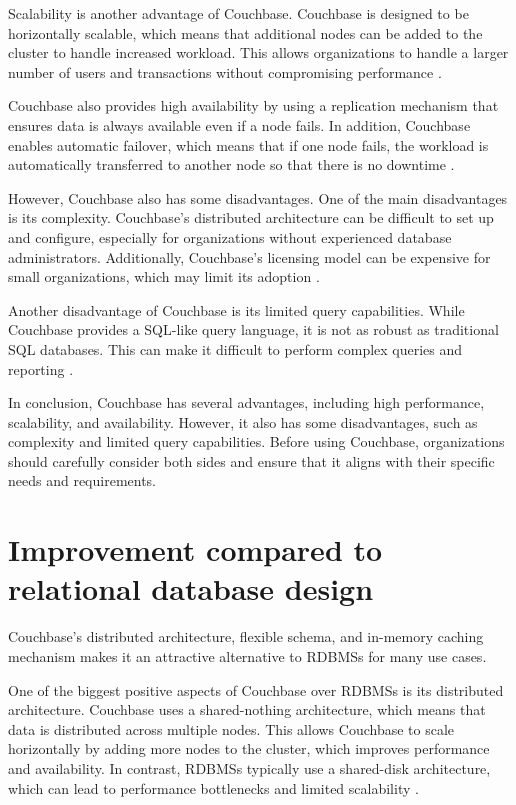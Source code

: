 Scalability is another advantage of Couchbase. Couchbase is designed to be horizontally scalable, which means that additional nodes can be added to the cluster to handle increased workload. This allows organizations to handle a larger number of users and transactions without compromising performance \parencite{Couchbase.20230414} \parencite{Couchbase.Review} \parencite{CouchbaseArchitecturalAdvantages}.

Couchbase also provides high availability by using a replication mechanism that ensures data is always available even if a node fails. In addition, Couchbase enables automatic failover, which means that if one node fails, the workload is automatically transferred to another node so that there is no downtime \parencite{Couchbase.20230414} \parencite{Couchbase.Review} \parencite{CouchbaseArchitecturalAdvantages}.

However, Couchbase also has some disadvantages. One of the main disadvantages is its complexity. Couchbase's distributed architecture can be difficult to set up and configure, especially for organizations without experienced database administrators. Additionally, Couchbase's licensing model can be expensive for small organizations, which may limit its adoption \parencite{CouchbaseDisadvantages} \parencite{CouchbaseProsAndCons}.

Another disadvantage of Couchbase is its limited query capabilities. While Couchbase provides a \ac{SQL}-like query language, it is not as robust as traditional \ac{SQL} databases. This can make it difficult to perform complex queries and reporting \parencite{CouchbaseDisadvantages} \parencite{CouchbaseCons}.

In conclusion, Couchbase has several advantages, including high performance, scalability, and availability. However, it also has some disadvantages, such as complexity and limited query capabilities. Before using Couchbase, organizations should carefully consider both sides and ensure that it aligns with their specific needs and requirements.

\section{Improvement compared to relational database design}

Couchbase's distributed architecture, flexible schema, and in-memory caching mechanism makes it an attractive alternative to \acp{RDBMS} for many use cases.

One of the biggest positive aspects of Couchbase over \acp{RDBMS} is its distributed architecture. Couchbase uses a shared-nothing architecture, which means that data is distributed across multiple nodes. This allows Couchbase to scale horizontally by adding more nodes to the cluster, which improves performance and availability. In contrast, \acp{RDBMS} typically use a shared-disk architecture, which can lead to performance bottlenecks and limited scalability \parencite{CouchbaseVsRelational} \parencite{ComparingDatabases} \parencite{DifferencesBetweenDatabases}.


